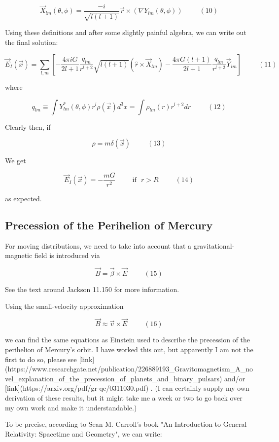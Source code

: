 \documentclass {article}
\begin{document}
$$\vec X_{lm}(\theta, \phi) = \frac {-i}{\sqrt{l(l+1)}} \vec r \times \left( \nabla Y_{lm}(\theta, \phi) \right) ~~~~~~~~~~~ (10)$$

Using these definitions and after some slightly painful algebra, we can write out the final solution:

$$\vec E_I(\vec x) = \sum_{l,m} \left[ -\frac {4\pi i G }{2l+1} \frac {q_{lm}}{r^{l+2}} \sqrt {l(l+1)} \left(\hat r \times \vec X_{lm} \right)  - \frac {4 \pi G (l+1)}{2l+1} \frac {q_{lm}}{r^{l+2}} \vec Y_{lm} \right] ~~~~~~~~~~~ (11)$$

where

$$q_{lm} \equiv \int Y_{lm}^* (\theta, \phi) r^l \rho (\vec x ) d^3x = \int \rho_{lm} (r) r^{l+2}dr ~~~~~~~~~~~ (12)$$

Clearly then, if

$$\rho = m\delta(\vec x) ~~~~~~~~~~~ (13)$$

We get

$$\vec E_I(\vec x) = - \frac {mG} {r^2}  ~~~~~~~~~~~ \textrm{if} ~~~ r > R ~~~~~~~~~~~ (14)$$

as expected.

\subsection{Precession of the Perihelion of Mercury}

For moving distributions, we need to take into account that a gravitational-magnetic field is introduced via

$$\vec B = \vec \beta \times \vec E ~~~~~~~~~~~ (15)$$

See the text around Jackson 11.150 for more information. 

Using the small-velocity approximation 

$$\vec B \approx \vec v \times \vec E ~~~~~~~~~~~ (16)$$

we can find the same equations as Einstein used to describe the precession of the perihelion of Mercury's orbit. I have worked this out, but apparently I am not the first to do so, please see [link](https://www.researchgate.net/publication/226889193\_Gravitomagnetism\_A\_novel\_explanation\_of\_the\_precession\_of\_planets\_and\_binary\_pulsars) and/or [link](https://arxiv.org/pdf/gr-qc/0311030.pdf) . (I can certainly supply my own derivation of these results, but it might take me a week or two to go back over my own work and make it understandable.)

To be precise, according to Sean M. Carroll's book "An Introduction to General Relativity: Spacetime and Geometry", we can write:
\end{document}
